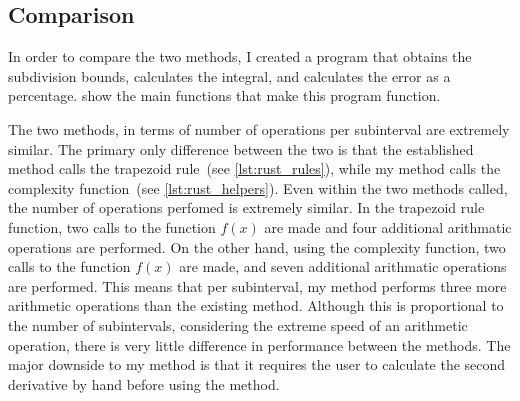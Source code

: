 \documentclass{paper}
\begin{document}
\subsection{Comparison}
\label{sec:comparison}
In order to compare the two methods, I created a program that obtains the subdivision bounds, calculates the integral, and calculates the error as a percentage.
 show the main functions that make this program function.
%




%
The two methods, in terms of number of operations per subinterval are extremely similar.
The primary only difference between the two is that the established method calls the trapezoid rule~(see \cref{lst:rust_rules}), while my method calls the complexity function~(see \cref{lst:rust_helpers}).
Even within the two methods called, the number of operations perfomed is extremely similar.
In the trapezoid rule function, two calls to the function \(f(x)\) are made and four additional arithmatic operations are performed.
On the other hand, using the complexity function, two calls to the function \(f(x)\) are made, and seven additional arithmatic operations are performed.
This means that per subinterval, my method performs three more arithmetic operations than the existing method.
Although this is proportional to the number of subintervals, considering the extreme speed of an arithmetic operation, there is very little difference in performance between the methods.
The major downside to my method is that it requires the user to calculate the second derivative by hand before using the method.
\end{document}
